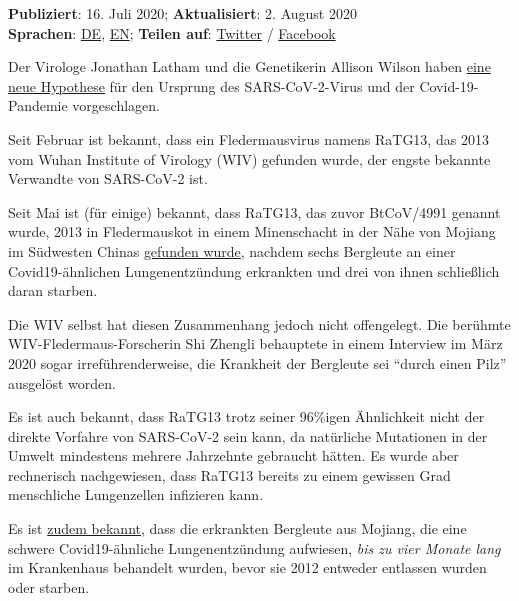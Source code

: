 \textbf{Publiziert}: 16. Juli 2020; \textbf{Aktualisiert}: 2. August
2020\\
\textbf{Sprachen}:
\href{https://swprs.org/ursprung-des-covid-19-virus-die-mojiang-minenarbeiter-hypothese/}{DE},
\href{https://swprs.org/covid-19-virus-origin-the-mojiang-miners-passage-hypothesis/}{EN};
\textbf{Teilen auf}:
\href{https://twitter.com/intent/tweet?url=https://swprs.org/ursprung-des-covid-19-virus-die-mojiang-minenarbeiter-hypothese/}{Twitter}
/
\href{https://www.facebook.com/share.php?u=https://swprs.org/ursprung-des-covid-19-virus-die-mojiang-minenarbeiter-hypothese/}{Facebook}

Der Virologe Jonathan Latham und die Genetikerin Allison Wilson haben
\href{https://www.independentsciencenews.org/commentaries/a-proposed-origin-for-sars-cov-2-and-the-covid-19-pandemic/}{eine
neue Hypothese} für den Ursprung des SARS-CoV-2-Virus und der
Covid-19-Pandemie vorgeschlagen.

Seit Februar ist bekannt, dass ein Fledermausvirus namens RaTG13, das
2013 vom Wuhan Institute of Virology (WIV) gefunden wurde, der engste
bekannte Verwandte von SARS-CoV-2 ist.

Seit Mai ist (für einige) bekannt, dass RaTG13, das zuvor BtCoV/4991
genannt wurde, 2013 in Fledermauskot in einem Minenschacht in der Nähe
von Mojiang im Südwesten Chinas
\href{https://www.thetimes.co.uk/article/seven-year-covid-trail-revealed-l5vxt7jqp}{gefunden
wurde}, nachdem sechs Bergleute an einer Covid19-ähnlichen
Lungenentzündung erkrankten und drei von ihnen schließlich daran
starben.

Die WIV selbst hat diesen Zusammenhang jedoch nicht offengelegt. Die
berühmte WIV-Fledermaus-Forscherin Shi Zhengli behauptete in einem
Interview im März 2020 sogar irre­füh­render­weise, die Krankheit der
Bergleute sei ``durch einen Pilz'' ausgelöst worden.

Es ist auch bekannt, dass RaTG13 trotz seiner 96\%igen Ähnlichkeit nicht
der direkte Vorfahre von SARS-CoV-2 sein kann, da natürliche Mutationen
in der Umwelt mindestens mehrere Jahrzehnte gebraucht hätten. Es wurde
aber rechnerisch nachgewiesen, dass RaTG13 bereits zu einem gewissen
Grad menschliche Lungenzellen infizieren kann.

Es ist
\href{https://www.documentcloud.org/documents/6981198-Analysis-of-Six-Patients-With-Unknown-Viruses.html}{zudem
bekannt}, dass die erkrankten Bergleute aus Mojiang, die eine schwere
Covid19-ähnliche Lungenentzündung aufwiesen, \emph{bis zu vier Monate
lang} im Krankenhaus behandelt wurden, bevor sie 2012 entweder entlassen
wurden oder starben.

